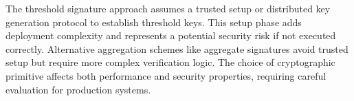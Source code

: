 The threshold signature approach assumes a trusted setup or distributed key generation protocol to establish threshold keys. This setup phase adds deployment complexity and represents a potential security risk if not executed correctly. Alternative aggregation schemes like aggregate signatures avoid trusted setup but require more complex verification logic. The choice of cryptographic primitive affects both performance and security properties, requiring careful evaluation for production systems.